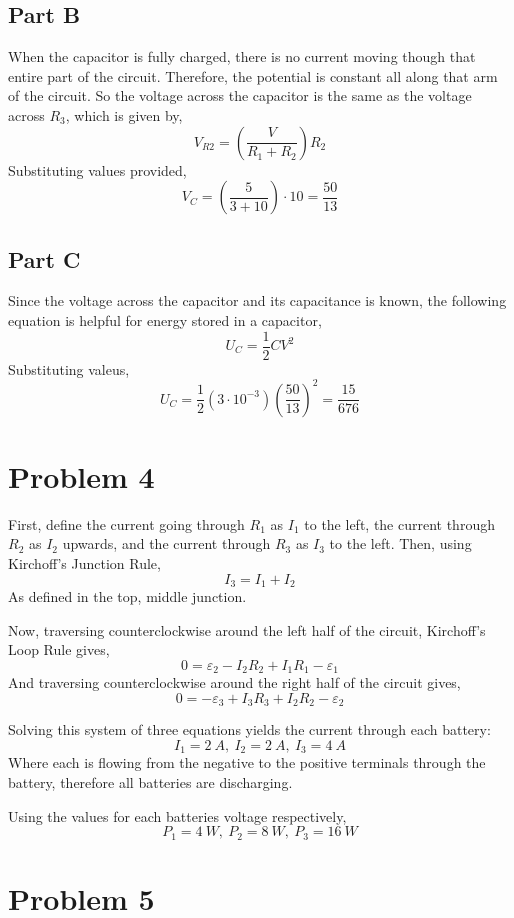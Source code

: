 \documentclass{article}
\begin{document}
\subsection*{Part B}

When the capacitor is fully charged, there is no current moving though that
entire part of the circuit. Therefore, the potential is constant all along that
arm of the circuit. So the voltage across the capacitor is the same as the
voltage across $R_3$, which is given by,
$$ V_{R2} = \left( \frac{V}{R_1 + R_2} \right) R_2 $$
Substituting values provided,
$$ V_{C} = \left ( \frac{5}{3 + 10} \right) \cdot 10 = \frac{50}{13} $$

\subsection*{Part C}

Since the voltage across the capacitor and its capacitance is known, the
following equation is helpful for energy stored in a capacitor,
$$ U_C = \frac{1}{2} C V^2 $$
Substituting valeus,
$$ U_C = \frac{1}{2} (3 \cdot 10^{-3}) \left(\frac{50}{13}\right)^2 =
\frac{15}{676} $$

\section*{Problem 4}

First, define the current going through $R_1$ as $I_1$ to the left, the
current through $R_2$ as $I_2$ upwards, and the current through $R_3$ as
$I_3$ to the left. Then, using Kirchoff's Junction Rule,
$$ I_3 = I_1 + I_2 $$
As defined in the top, middle junction.

Now, traversing counterclockwise around the left half of the circuit, Kirchoff's
Loop Rule gives,
$$ 0 = \varepsilon_2 - I_2 R_2 + I_1 R_1 - \varepsilon_1 $$
And traversing counterclockwise around the right half of the circuit gives,
$$ 0 = -\varepsilon_3 + I_3 R_3 + I_2 R_2 - \varepsilon_2 $$

Solving this system of three equations yields the current through each battery:
$$ I_1 = 2\ \si{A},\ I_2 = 2\ \si{A},\ I_3 = 4\ \si{A} $$
Where each is flowing from the negative to the positive terminals through the
battery, therefore all batteries are discharging.

Using the values for each batteries voltage respectively,
$$ P_1 = 4\ \si{W},\ P_2 = 8\ \si{W},\ P_3 = 16\ \si{W} $$

\section*{Problem 5}
\end{document}

